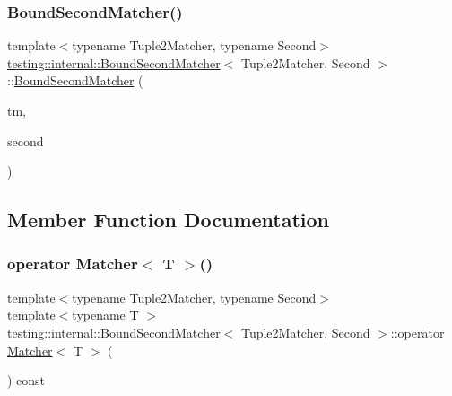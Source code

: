 \subsubsection{\texorpdfstring{Bound\+Second\+Matcher()}{BoundSecondMatcher()}}
{\footnotesize\ttfamily template$<$typename Tuple2\+Matcher, typename Second$>$ \\
\hyperlink{classtesting_1_1internal_1_1_bound_second_matcher}{testing\+::internal\+::\+Bound\+Second\+Matcher}$<$ Tuple2\+Matcher, Second $>$\+::\hyperlink{classtesting_1_1internal_1_1_bound_second_matcher}{Bound\+Second\+Matcher} (\begin{DoxyParamCaption}\item[{const Tuple2\+Matcher \&}]{tm,  }\item[{const Second \&}]{second }\end{DoxyParamCaption})\hspace{0.3cm}{\ttfamily [inline]}}



\subsection{Member Function Documentation}
\mbox{\label{classtesting_1_1internal_1_1_bound_second_matcher_abc5264ca86c2440b663036dcfb5403de}} 
\subsubsection{\texorpdfstring{operator Matcher$<$ T $>$()}{operator Matcher< T >()}}
{\footnotesize\ttfamily template$<$typename Tuple2\+Matcher, typename Second$>$ \\
template$<$typename T $>$ \\
\hyperlink{classtesting_1_1internal_1_1_bound_second_matcher}{testing\+::internal\+::\+Bound\+Second\+Matcher}$<$ Tuple2\+Matcher, Second $>$\+::operator \hyperlink{classtesting_1_1_matcher}{Matcher}$<$ T $>$ (\begin{DoxyParamCaption}{ }\end{DoxyParamCaption}) const\hspace{0.3cm}{\ttfamily [inline]}}

